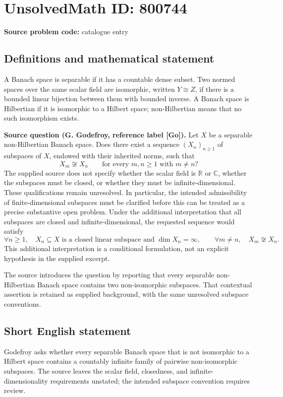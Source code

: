 \documentclass[11pt]{article}
\newcommand{\R}{\mathbb{R}}
\newcommand{\C}{\mathbb{C}}
\begin{document}
\section*{UnsolvedMath ID: 800744}
\textbf{Source problem code:} catalogue entry
\subsection{Definitions and mathematical statement}
A Banach space is separable if it has a countable dense subset. Two normed spaces over the same scalar field are isomorphic, written \(Y\cong Z\), if there is a bounded linear bijection between them with bounded inverse. A Banach space is Hilbertian if it is isomorphic to a Hilbert space; non-Hilbertian means that no such isomorphism exists.

\textbf{Source question (G. Godefroy, reference label [Go]).} Let \(X\) be a separable non-Hilbertian Banach space. Does there exist a sequence \((X_n)_{n\geq 1}\) of subspaces of \(X\), endowed with their inherited norms, such that
\[
X_m\not\cong X_n\qquad\text{for every }m,n\geq 1\text{ with }m\neq n?
\]
The supplied source does not specify whether the scalar field is \(\R\) or \(\C\), whether the subspaces must be closed, or whether they must be infinite-dimensional. These qualifications remain unresolved. In particular, the intended admissibility of finite-dimensional subspaces must be clarified before this can be treated as a precise substantive open problem. Under the additional interpretation that all subspaces are closed and infinite-dimensional, the requested sequence would satisfy
\[
\forall n\geq 1,\quad X_n\subseteq X\text{ is a closed linear subspace and }\dim X_n=\infty,
\qquad
\forall m\neq n,\quad X_m\not\cong X_n.
\]
This additional interpretation is a conditional formulation, not an explicit hypothesis in the supplied excerpt.

The source introduces the question by reporting that every separable non-Hilbertian Banach space contains two non-isomorphic subspaces. That contextual assertion is retained as supplied background, with the same unresolved subspace conventions.
\subsection{Short English statement}
Godefroy asks whether every separable Banach space that is not isomorphic to a Hilbert space contains a countably infinite family of pairwise non-isomorphic subspaces. The source leaves the scalar field, closedness, and infinite-dimensionality requirements unstated; the intended subspace convention requires review.
\end{document}

